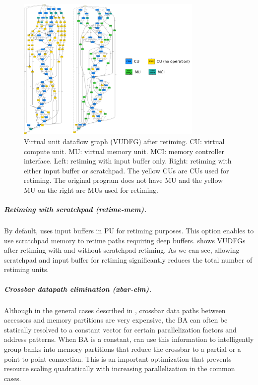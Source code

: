 \begin{figure}
\centering
\includegraphics[width=0.8\textwidth]{figs/retiming.pdf}
\caption[Retiming]{
  Virtual unit dataflow graph (VUDFG) after retiming. CU: virtual compute unit. MU: virtual memory
  unit. MCI: memory controller interface.
  Left: retiming with input buffer only. Right: retiming with either input buffer or scratchpad.
  The yellow CUs are CUs used for retiming. The original program does not have MU and the yellow MU
  on the right are MUs used for retiming. 
}
\label{fig:retiming}
\end{figure}
\subparagraph{Retiming with scratchpad (retime-mem).} 
By default, \name{} uses input buffers in PU for retiming purposes. 
This option enables \name{} to use scratchpad memory to retime paths requiring deep buffers.
 shows VUDFGs after retiming with and without scratchpad retiming. As we can see,
allowing scratchpad and input buffer for retiming significantly reduces the total number of retiming
units.

\subparagraph{Crossbar datapath elimination (xbar-elm).}
Although in the general cases described in , 
crossbar data paths between accessors and memory partitions are very expensive, 
the BA can often be statically resolved to a constant vector for certain
parallelization factors and address patterns.  
When BA is a constant, \name{} can use this information to intelligently 
group banks into memory partitions that reduce the crossbar to a partial 
or a point-to-point connection.
This is an important optimization that prevents resource scaling quadratically with increasing
parallelization in the common cases.

